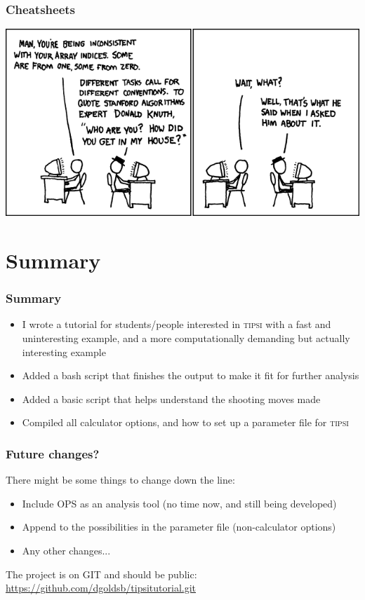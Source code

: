 \documentclass[hyperref={pdfpagelabels=false}]{beamer}
\begin{document}
\begin{frame}
\frametitle{Cheatsheets}
\begin{center}
\includegraphics[scale=4]{images/donald_knuth.png}
\end{center}
\end{frame}

\section{Summary}
\setcounter{subsection}{1}

\begin{frame}
\frametitle{Summary} 
\begin{itemize}
\item I wrote a tutorial for students/people interested in \textsc{tipsi} with a fast and uninteresting example, and a more computationally demanding but actually interesting example
\item Added a bash script that finishes the output to make it fit for further analysis
\item Added a basic script that helps understand the shooting moves made
\item Compiled all calculator options, and how to set up a parameter file for \textsc{tipsi}
\end{itemize}
\end{frame}

\begin{frame}
\frametitle{Future changes?}
There might be some things to change down the line:
\begin{itemize}
\item Include OPS as an analysis tool (no time now, and still being developed)
\item Append to the possibilities in the parameter file (non-calculator options)
\item Any other changes...
\end{itemize} 
The project is on GIT and should be public: \url{https://github.com/dgoldsb/tipsitutorial.git}
\end{frame}
\end{document}

